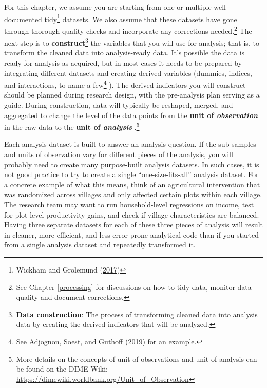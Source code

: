 \documentclass[
]{book}
\begin{document}
For this chapter, we assume you are starting from
one or multiple well-documented tidy\footnote{Wickham and Grolemund (\protect\hyperlink{ref-hadley2017R}{2017})} datasets.
We also assume that these datasets
have gone through thorough quality checks
and incorporate any corrections needed.\footnote{See Chapter \ref{processing} for discussions on how to
  tidy data, monitor data quality and document corrections.}
The next step is to \textbf{construct}\footnote{\textbf{Data construction}:
  The process of transforming cleaned data into analysis data by
  creating the derived indicators that will be analyzed.}
the variables that you will use for analysis;
that is, to transform the cleaned data into analysis-ready data.
It's possible the data is ready for analysis as acquired,
but in most cases it needs to be prepared by integrating different datasets
and creating derived variables
(dummies, indices, and interactions, to name a few\footnote{See Adjognon, Soest, and Guthoff (\protect\hyperlink{ref-adjognon2019reducing}{2019}) for an example.}
).
The derived indicators you will construct should be
planned during research design,
with the pre-analysis plan serving as a guide.
During construction, data will typically be
reshaped, merged, and aggregated to change the level of the data points
from the \textbf{unit of \emph{observation} } in the raw data
to the \textbf{unit of \emph{analysis} }.\footnote{More details on the concepts of unit of observations
  and unit of analysis
  can be found on the DIME Wiki:
  \url{https://dimewiki.worldbank.org/Unit_of_Observation}}

Each analysis dataset is built to answer an analysis question.
If the sub-samples and units of observation
vary for different pieces of the analysis,
you will probably need to create many purpose-built analysis datasets.
In such cases, it is not good practice
to try to create a single ``one-size-fits-all'' analysis dataset.
For a concrete example of what this means,
think of an agricultural intervention
that was randomized across villages
and only affected certain plots within each village.
The research team may want to
run household-level regressions on income,
test for plot-level productivity gains,
and check if village characteristics are balanced.
Having three separate datasets for each of these three pieces of analysis
will result in cleaner, more efficient, and less error-prone analytical code than if
you started from a single analysis dataset and repeatedly transformed it.
\end{document}
